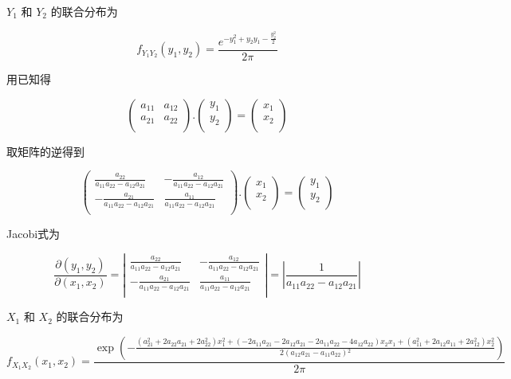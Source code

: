 \documentclass[UTF8]{article}
\begin{document}
\(Y_1\) 和 \(Y_2\) 的联合分布为

\[f_{Y_1Y_2}(y_1,y_2)=\frac{e^{-y_1^2+y_2 y_1-\frac{y_2^2}{2}}}{2 \pi }\]

用已知得

\[\left(
\begin{array}{cc}
 a_{11} & a_{12} \\
 a_{21} & a_{22} \\
\end{array}
\right).\left(
\begin{array}{c}
 y_1 \\
 y_2 \\
\end{array}
\right)=\left(
\begin{array}{c}
 x_1 \\
 x_2 \\
\end{array}
\right)\]

取矩阵的逆得到

\[\left(
\begin{array}{cc}
 \frac{a_{22}}{a_{11} a_{22}-a_{12} a_{21}} & -\frac{a_{12}}{a_{11} a_{22}-a_{12} a_{21}} \\
 -\frac{a_{21}}{a_{11} a_{22}-a_{12} a_{21}} & \frac{a_{11}}{a_{11} a_{22}-a_{12} a_{21}} \\
\end{array}
\right).\left(
\begin{array}{c}
 x_1 \\
 x_2 \\
\end{array}
\right)=\left(
\begin{array}{c}
 y_1 \\
 y_2 \\
\end{array}
\right)\]

Jacobi式为

\[\frac{\partial(y_1, y_2)}{\partial(x_1, x_2)}=\left|
\begin{array}{cc}
 \frac{a_{22}}{a_{11} a_{22}-a_{12} a_{21}} & -\frac{a_{12}}{a_{11} a_{22}-a_{12} a_{21}} \\
 -\frac{a_{21}}{a_{11} a_{22}-a_{12} a_{21}} & \frac{a_{11}}{a_{11} a_{22}-a_{12} a_{21}} \\
\end{array}
\right|=\left|\frac{1}{a_{11} a_{22}-a_{12} a_{21}}\right|\]

\(X_1\) 和 \(X_2\) 的联合分布为

\[f_{X_1X_2}(x_1,x_2)=\frac{\exp \left(-\frac{\left(a_{21}^2+2 a_{22} a_{21}+2 a_{22}^2\right) x_1^2+\left(-2 a_{11} a_{21}-2 a_{12} a_{21}-2 a_{11} a_{22}-4 a_{12} a_{22}\right) x_2 x_1+\left(a_{11}^2+2 a_{12} a_{11}+2 a_{12}^2\right) x_2^2}{2 \left(a_{12} a_{21}-a_{11} a_{22}\right){}^2}\right)}{2 \pi }\]
\end{document}
